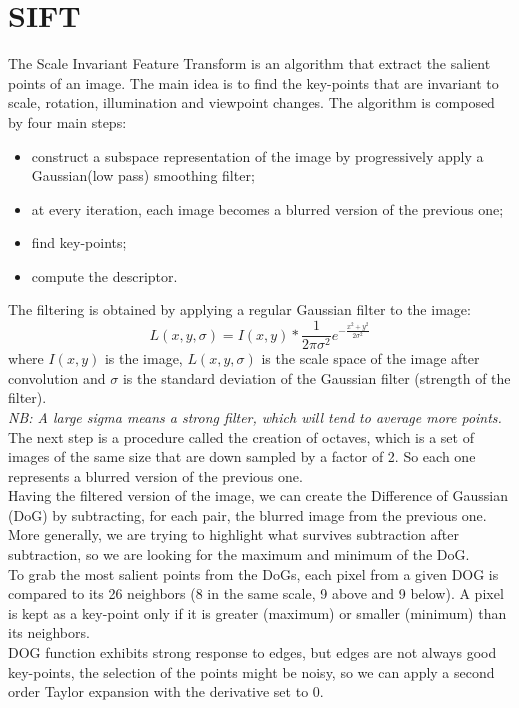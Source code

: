 \section{SIFT}
The Scale Invariant Feature Transform is an algorithm that extract the salient points of an image.
The main idea is to find the key-points that are invariant to scale, rotation, illumination and viewpoint changes.
The algorithm is composed by four main steps:
\begin{itemize}
    \item construct a subspace representation of the image by progressively apply a Gaussian(low pass) smoothing filter;
    \item at every iteration, each image becomes a blurred version of the previous one;
    \item find key-points;
    \item compute the descriptor.
\end{itemize}
The filtering is obtained by applying a regular Gaussian filter to the image:
\[
    L(x,y,\sigma) = I(x,y) * \frac{1}{2\pi\sigma^2}e^{-\frac{x^2+y^2}{2\sigma^2}}
\]
where $I(x,y)$ is the image, $L(x,y,\sigma)$ is the scale space of the image after convolution and $\sigma$ is the standard deviation of the Gaussian filter (strength of the filter).
\\\textit{NB: A large sigma means a strong filter, which will tend to average more points.}
\\
The next step is a procedure called the creation of octaves, which is a set of images of the same size that are down sampled by a factor of 2.
So each one represents a blurred version of the previous one.
\\Having the filtered version of the image, we can create the Difference of Gaussian (DoG) by subtracting, for each pair, the blurred image from the previous one.
More generally, we are trying to highlight what survives subtraction after subtraction, so we are looking for the maximum and minimum of the DoG.
\\To grab the most salient points from the DoGs, each pixel from a given DOG is compared to its 26 neighbors (8 in the same scale, 9 above and 9 below).
A pixel is kept as a key-point only if it is greater (maximum) or smaller (minimum) than its neighbors.
\\DOG function exhibits strong response to edges, but edges are not always good key-points, the selection of the points might be noisy, so we can apply a second order Taylor expansion with the derivative set to $0$. 
